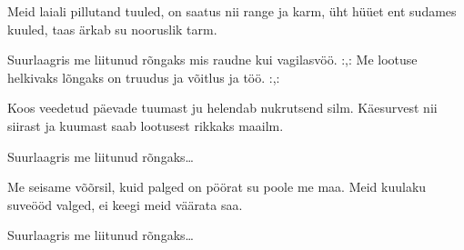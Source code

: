 Meid laiali pillutand tuuled,
on saatus nii range ja karm,
\"uht h\"u\"uet ent sudames kuuled,
taas \"arkab su nooruslik tarm.

Suurlaagris me liitunud r\~ongaks
mis raudne kui vagilasv\"o\"o.
:,: Me lootuse helkivaks l\~ongaks
on truudus ja v\~oitlus ja t\"o\"o. :,:

Koos veedetud p\"aevade tuumast
ju helendab nukrutsend silm.
K\"aesurvest nii siirast ja kuumast
saab lootusest rikkaks maailm.

Suurlaagris me liitunud r\~ongaks\ldots

\clearpage Me seisame v\~o\~orsil, kuid palged
on p\"o\"orat su poole me maa.
Meid kuulaku suve\"o\"od valged,
ei keegi meid v\"a\"arata saa.

Suurlaagris me liitunud r\~ongaks\ldots
